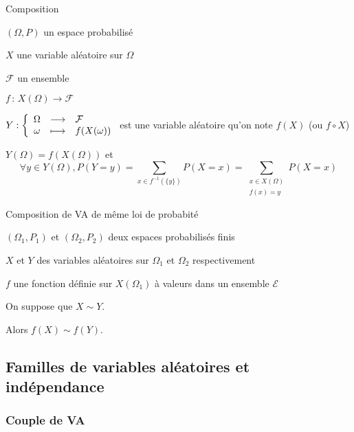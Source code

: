     \begin{prop}{Composition}{}
        \begin{soient}
            \item $(\Omega,P)$ un espace probabilisé
            \item $X$ une variable aléatoire sur $\Omega$
            \item $\mathcal{F}$ un ensemble
            \item $f\, : \, X(\Omega) \longrightarrow \mathcal{F}$
        \end{soient}
        \begin{alors}
            \item $\fonction{Y}{\Omega}{\mathcal{F}}{\omega}{f(X(\omega))}$ est une variable aléatoire qu’on note $f(X)$ (ou $f \circ X$)
            \item $Y(\Omega) = f(X(\Omega))$ et 
            \[ \forall y \in Y(\Omega), P(Y=y) = \sum\limits_{x \in f^{-1}(\{y\})} P(X=x) = \sum\limits_{\substack{x \in X(\Omega) \\ f(x) = y}} P(X = x) \]
        \end{alors}
    \end{prop}

    \begin{prop}{Composition de VA de même loi de probabité}{}
        \begin{soient}
            \item $(\Omega_1,P_1)$ et $(\Omega_2,P_2)$ deux espaces probabilisés finis
            \item $X$ et $Y$ des variables aléatoires sur $\Omega_1$ et $\Omega_2$ respectivement
            \item $f$ une fonction définie sur $X(\Omega_1)$ à valeurs dans un ensemble $\mathcal{E}$
        \end{soient}
        On suppose que $X \sim Y$.

        Alors $f(X) \sim f(Y)$.
    \end{prop}

\subsection{Familles de variables aléatoires et indépendance}

    \subsubsection{Couple de VA}


